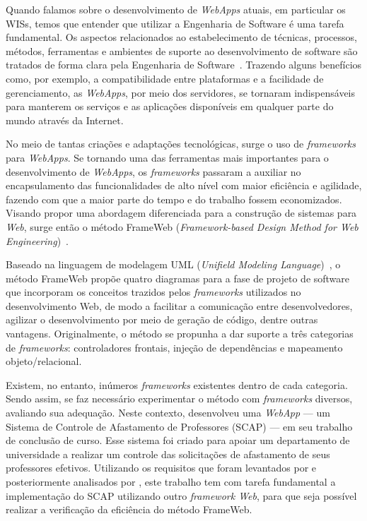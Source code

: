 Quando falamos sobre o desenvolvimento de \textit{WebApps} atuais, em particular os WISs, temos que entender que utilizar a Engenharia de Software é uma tarefa fundamental. Os aspectos relacionados ao estabelecimento de técnicas, processos, métodos, ferramentas e ambientes de suporte ao desenvolvimento de software são tratados de forma clara pela Engenharia de Software~\cite{falbo:es14}. Trazendo alguns benefícios como, por exemplo, a compatibilidade entre plataformas e a facilidade de gerenciamento, as \textit{WebApps}, por meio dos servidores, se tornaram indispensáveis para manterem os serviços e as aplicações disponíveis em qualquer parte do mundo através da Internet.

No meio de tantas criações e adaptações tecnológicas, surge o uso de \textit{frameworks} para \textit{WebApps}. Se tornando uma das ferramentas mais importantes para o desenvolvimento de \textit{WebApps}, os \textit{frameworks} passaram a auxiliar no encapsulamento das funcionalidades de alto nível com maior eficiência e agilidade, fazendo com que a maior parte do tempo e do trabalho fossem economizados. Visando propor uma abordagem diferenciada para a construção de sistemas para \textit{Web}, surge então o método FrameWeb (\textit{Framework-based Design Method for Web Engineering})~\cite{souza:masterthesis07,souza-celebratingfalbo20}.

Baseado na linguagem de modelagem UML (\textit{Unifield Modeling Language})~\cite{booch-et-al:u06}, o método FrameWeb propõe quatro diagramas para a fase de projeto de software que incorporam os conceitos trazidos pelos \textit{frameworks} utilizados no desenvolvimento Web, de modo a facilitar a comunicação entre desenvolvedores, agilizar o desenvolvimento por meio de geração de código, dentre outras vantagens. Originalmente, o método se propunha a dar suporte a três categorias de \textit{frameworks}: controladores frontais, injeção de dependências e mapeamento objeto/relacional.

Existem, no entanto, inúmeros \textit{frameworks} existentes dentro de cada categoria. Sendo assim, se faz necessário experimentar o método com \textit{frameworks} diversos, avaliando sua adequação. Neste contexto,  desenvolveu uma \textit{WebApp} --- um Sistema de Controle de Afastamento de Professores (SCAP) --- em seu trabalho de conclusão de curso. Esse sistema foi criado para apoiar um departamento de universidade a realizar um controle das solicitações de afastamento de seus professores efetivos. Utilizando os requisitos que foram levantados por  e posteriormente analisados por , este trabalho tem com tarefa fundamental a implementação do SCAP utilizando outro \textit{framework Web}, para que seja possível realizar a verificação da eficiência do método FrameWeb.

